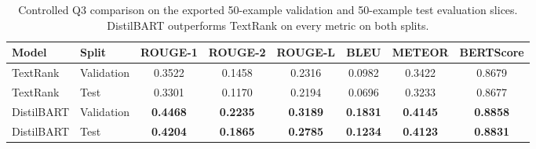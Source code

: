 \begin{table}[H]
\centering
\small
\setlength{\tabcolsep}{4pt}
\begin{tabularx}{\linewidth}{>{\raggedright\arraybackslash}l >{\raggedright\arraybackslash}l c c c c c c}
\toprule
Model & Split & ROUGE-1 & ROUGE-2 & ROUGE-L & BLEU & METEOR & BERTScore \\
\midrule
TextRank   & Validation & 0.3522 & 0.1458 & 0.2316 & 0.0982 & 0.3422 & 0.8679 \\
TextRank   & Test       & 0.3301 & 0.1170 & 0.2194 & 0.0696 & 0.3233 & 0.8677 \\
DistilBART & Validation & \textbf{0.4468} & \textbf{0.2235} & \textbf{0.3189} & \textbf{0.1831} & \textbf{0.4145} & \textbf{0.8858} \\
DistilBART & Test       & \textbf{0.4204} & \textbf{0.1865} & \textbf{0.2785} & \textbf{0.1234} & \textbf{0.4123} & \textbf{0.8831} \\
\bottomrule
\end{tabularx}
\caption{Controlled Q3 comparison on the exported 50-example validation and 50-example test evaluation slices. DistilBART outperforms TextRank on every metric on both splits.}
\label{tab:q3_overall_results}
\end{table}